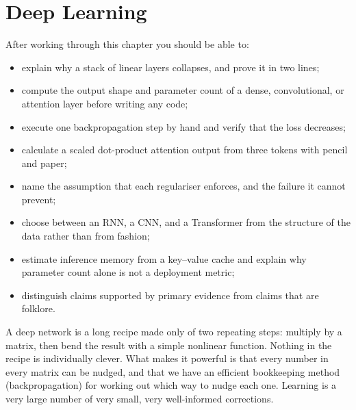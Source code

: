 
\chapter{Deep Learning}
\label{ch:deep-learning}


\begin{learningobjectives}
After working through this chapter you should be able to:
\begin{itemize}
  \item explain why a stack of linear layers collapses, and prove it in two
        lines;
  \item compute the output shape and parameter count of a dense, convolutional,
        or attention layer before writing any code;
  \item execute one backpropagation step by hand and verify that the loss
        decreases;
  \item calculate a scaled dot-product attention output from three tokens with
        pencil and paper;
  \item name the assumption that each regulariser enforces, and the failure it
        cannot prevent;
  \item choose between an RNN, a CNN, and a Transformer from the structure of
        the data rather than from fashion;
  \item estimate inference memory from a key--value cache and explain why
        parameter count alone is not a deployment metric;
  \item distinguish claims supported by primary evidence from claims that are
        folklore.
\end{itemize}
\end{learningobjectives}

\begin{plainlanguage}
A deep network is a long recipe made only of two repeating steps: multiply by
a matrix, then bend the result with a simple nonlinear function. Nothing in the
recipe is individually clever. What makes it powerful is that every number in
every matrix can be nudged, and that we have an efficient bookkeeping method
(backpropagation) for working out which way to nudge each one. Learning is a
very large number of very small, very well-informed corrections.
\end{plainlanguage}

